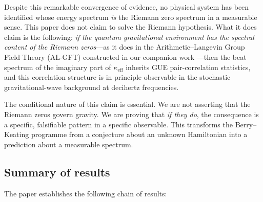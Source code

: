 \documentclass[12pt,a4paper]{article}
\begin{document}
Despite this remarkable convergence of evidence, no physical system has been identified whose energy spectrum \emph{is} the Riemann zero spectrum in a measurable sense.
This paper does not claim to solve the Riemann hypothesis.
What it does claim is the following: \emph{if the quantum gravitational environment has the spectral content of the Riemann zeros}---as it does in the Arithmetic--Langevin Group Field Theory (AL-GFT) constructed in our companion work \cite{ALGFTGate1}---then the beat spectrum of the imaginary part of $\kappa_{\mathrm{eff}}$ inherits GUE pair-correlation statistics, and this correlation structure is in principle observable in the stochastic gravitational-wave background at decihertz frequencies.

The conditional nature of this claim is essential.
We are not asserting that the Riemann zeros govern gravity.
We are proving that \emph{if they do}, the consequence is a specific, falsifiable pattern in a specific observable.
This transforms the Berry--Keating programme from a conjecture about an unknown Hamiltonian into a prediction about a measurable spectrum.


\subsection{Summary of results}\label{sec:summary}

The paper establishes the following chain of results:
\end{document}
